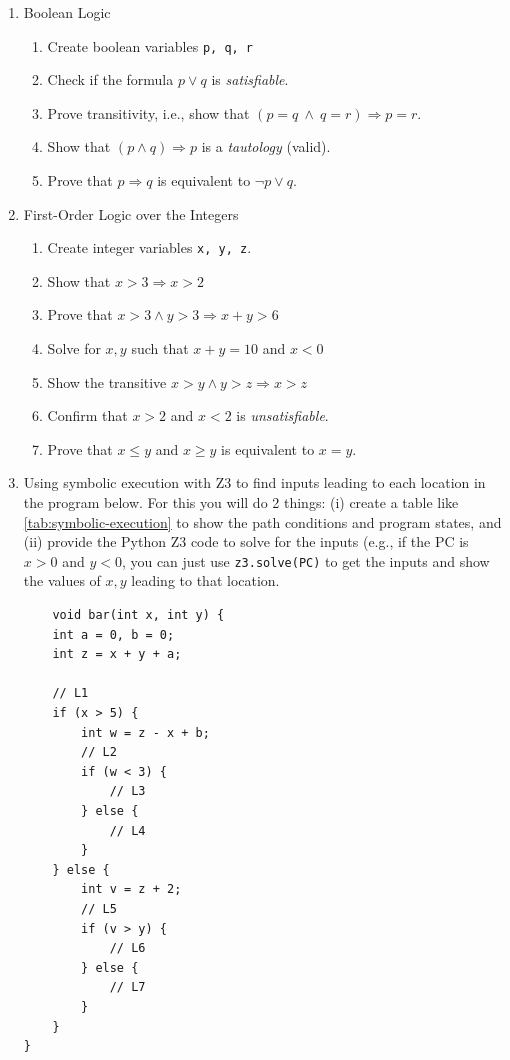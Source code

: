\documentclass[oneside,11pt,dvipsnames]{book}
\renewcommand{\implies}{\Rightarrow}
\newcommand{\code}[1]{\texttt{#1}}
\begin{document}
\begin{enumerate}

    \item Boolean Logic
    \begin{enumerate}
    \item Create boolean variables \texttt{p, q, r}
    \item Check if the formula $p \lor q$ is \emph{satisfiable}.
    \item Prove transitivity, i.e., show that $(p = q ~\land ~q =r) \implies p = r$.
    \item Show that $(p \land q) \implies p$ is a \emph{tautology} (valid).
    \item Prove that $p \implies q$ is equivalent to $\neg p \lor  q$.
    \end{enumerate}


    \item First-Order Logic over the Integers 
    \begin{enumerate}
    \item Create integer variables \texttt{x, y, z}.
    \item Show that $x > 3 \implies x > 2$
    \item Prove that $x > 3 \land y > 3 \implies x + y > 6$
    \item Solve for $x, y$ such that $x + y = 10$ and $x < 0$
    \item Show the transitive $x > y \land y > z \implies x > z$
    \item Confirm that $x > 2$ and $x < 2$ is \emph{unsatisfiable}.
    \item Prove that $x \le y$ and $x \ge y$ is equivalent to $x = y$.
    \end{enumerate}
    \item Using symbolic execution with Z3 to find inputs leading to each location in the program below.  For this you will do 2 things: (i) create a table like \autoref{tab:symbolic-execution} to show the path conditions and program states, and (ii) provide the Python Z3 code to solve for the inputs (e.g., if the PC is $x > 0$ and $y < 0$, you can just use \code{z3.solve(PC)} to get the inputs and show the values of $x, y$ leading to that location.
    
    \begin{lstlisting}
    void bar(int x, int y) {
    int a = 0, b = 0;  
    int z = x + y + a; 
    
    // L1
    if (x > 5) {
        int w = z - x + b;  
        // L2
        if (w < 3) {
            // L3
        } else {
            // L4
        }
    } else {
        int v = z + 2;  
        // L5
        if (v > y) {
            // L6
        } else {
            // L7
        }
    }
}
    \end{lstlisting}


\end{enumerate}
\end{document}
